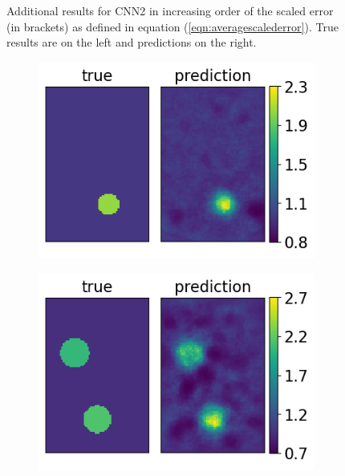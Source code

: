 \documentclass[12pt]{article}
\newcommand{\nhgappwidth}{0.24\linewidth}
\newcommand{\nhgappheight}{2.9cm}
\begin{document}
\begin{appendices}
\begin{figure}[!h]
\begin{subfigure}[c]{\nhgappwidth}
  \end{subfigure}
\caption{\label{fig:app2result} Additional results for CNN2 in increasing order of the scaled error (in brackets) as defined in equation (\ref{eqn:averagescalederror}). True results are on the left and predictions on the right.}  
\end{figure}
%
\begin{figure}[!h]
  \centering
  \begin{subfigure}[c]{\nhgappwidth}
    \centering    
    \includegraphics[totalheight=\nhgappheight]{Figures/AppendixNew/CNN3/ex5/mu.png}
  \end{subfigure}
  \begin{subfigure}[c]{\nhgappwidth}
    \centering    
    \includegraphics[totalheight=\nhgappheight]{Figures/AppendixNew/CNN3/ex6/mu.png}

\end{subfigure}
\end{figure}
\end{appendices}
\end{document}
